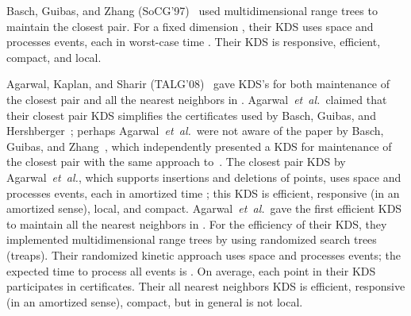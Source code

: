 \documentclass[11pt]{llncs}
\newcommand{\etal}{\emph{et~al.}}
\begin{document}
Basch, Guibas, and Zhang (SoCG'97)~\cite{Basch:1997:PPM:262839.262998} used multidimensional range trees to maintain the closest pair. For a fixed dimension , their KDS uses  space and processes  events, each in worst-case time . Their KDS is responsive, efficient, compact, and local.

Agarwal, Kaplan, and Sharir (TALG'08)~\cite{Agarwal:2008:KDD:1435375.1435379} gave KDS's for both maintenance of the closest pair and all the nearest neighbors in . Agarwal~\etal~claimed that their closest pair KDS simplifies the certificates used by Basch, Guibas, and Hershberger~\cite{Basch:1997:DSM:314161.314435}; perhaps Agarwal~\etal~were not aware of the paper by Basch, Guibas, and Zhang~\cite{Basch:1997:PPM:262839.262998}, which independently presented a KDS for maintenance of the closest pair with the same approach to~\cite{Basch:1997:PPM:262839.262998}. The closest pair KDS by Agarwal~\etal, which supports insertions and deletions of points, uses  space and processes  events, each in amortized time ; this KDS is efficient, responsive (in an amortized sense), local, and compact. 
Agarwal~\etal~gave the first efficient KDS to maintain all the nearest neighbors in . For the efficiency of their KDS, they implemented multidimensional range trees by using randomized search trees (treaps). Their randomized kinetic approach uses  space and processes  events; the expected time to process all events is . On average, each point in their KDS participates in  certificates. Their all nearest neighbors KDS is efficient, responsive (in an amortized sense), compact, but in general is not local. 
\end{document}
